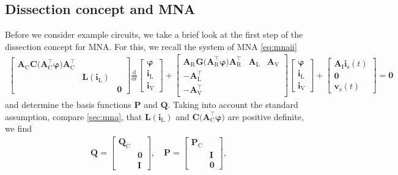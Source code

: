 \documentclass[AMA,STIX1COL]{WileyNJD-v2}
\newcommand{\mb}[1]{\mathbf{#1}}
\newcommand{\mr}[1]{\mathrm{#1}}
\newcommand{\T}{{\!\top}}
\newcommand{\ddt}{\frac{\mathrm{d}}{\mathrm{d}t}}
\newcommand{\A}[1]{\mb{A}_\mr{#1}}
\newcommand{\AT}[1]{\mb{A}_\mr{#1}^{\T}}
\newcommand{\vphi}{\boldsymbol{\varphi}}
\renewcommand{\i}[1]{\mb{i}_\mr{#1}}
\renewcommand{\v}[1]{\mb{v}_\mr{#1}}
\begin{document}
\subsection{Dissection concept and MNA}
\label{subsec:dcmna}
Before we consider example circuits, we take a brief look at the first step of the dissection concept for MNA. For this, we recall the system of MNA \eqref{eq:mnaii}
\begin{align*}
    \begin{bmatrix}
        \A{C}^{\phantom{\T}} \mb{C} \big( \AT{C} \vphi \big) \AT{C} & &\\
        & \mb{L}(\i{L}) &\\
        & & \mb{0}
    \end{bmatrix} \ddt \begin{bmatrix}
        \vphi\\
        \i{L}\\
        \i{V}
    \end{bmatrix} + \begin{bmatrix}
        \A{R}^{\phantom{\T}} \mb{G} \big( \AT{R} \vphi \big) \AT{R} & \A{L} & \A{V}\\
        -\AT{L} & &\\
        -\AT{V} & &
    \end{bmatrix} \begin{bmatrix}
        \vphi\\
        \i{L}\\
        \i{V}
    \end{bmatrix} + \begin{bmatrix}
        \A{I} \i{s}(t)\\
        \mb{0}\\
        \v{s}(t)
    \end{bmatrix} = \mb{0}
\end{align*}
and determine the basis functions $\mb{P}$ and $\mb{Q}$. Taking into account the standard assumption, compare \autoref{sec:mna}, that $\mb{L}(\i{L})$ and $\mb{C} \big( \AT{C} \vphi \big)$ are positive definite, we find\cite{jansen2014}
\begin{align*}
    \mb{Q} = \begin{bmatrix}
        \mb{Q}_\mr{C} &\\
        & \mb{0}\\
        & \mb{I}
    \end{bmatrix}, \quad \mb{P} = \begin{bmatrix}
        \mb{P}_\mr{C} &\\
        & \mb{I}\\
        & \mb{0}
    \end{bmatrix},
\end{align*}
\end{document}
